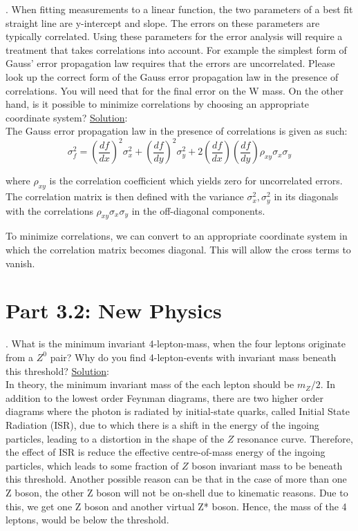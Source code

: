 \documentclass[a4paper]{report}
\numberwithin{equation}{section}
\begin{document}
.  When fitting measurements to a linear function, the two parameters of a best fit straight line are y-intercept and slope. The errors on these parameters are typically correlated. Using these parameters for the error analysis will require a treatment that takes correlations into account. For example the simplest form of Gauss’ error propagation law requires that the errors are uncorrelated. Please look up the correct form of the Gauss error propagation law in the presence of correlations. You will need that for the final error on the W mass. On the other hand, is it possible to minimize correlations by choosing an appropriate coordinate system?
\bigbreak
\noindent \underline{Solution}: \\
\noindent The Gauss error propagation law in the presence of correlations is given as such:
$$
	\sigma_f ^2 = \left( \frac{df}{dx} \right)^2 \sigma_x^2 + \left( \frac{df}{dy} \right)^2 \sigma_y^2 + 2 \left( \frac{df}{dx} \right) \left( \frac{df}{dy} \right) \rho_{xy} \sigma_{x} \sigma_y $$
	
\noindent where $\rho_{xy}$ is the correlation coefficient which yields zero for uncorrelated errors. The correlation matrix is then defined with the variance $\sigma_x^2, \sigma_y^2$ in its diagonals with the correlations $\rho_{xy} \sigma_x \sigma_y$ in the off-diagonal components.

\noindent To minimize correlations, we can convert to an appropriate coordinate system in which the correlation matrix becomes diagonal. This will allow the cross terms to vanish.

\section{Part 3.2: New Physics}

. What is the minimum invariant 4-lepton-mass, when the four leptons originate from a $Z^0$ pair? Why do you find 4-lepton-events with invariant mass beneath this threshold?
\bigbreak
\noindent \underline{Solution}: \\
\noindent In theory, the minimum invariant mass of the each lepton should be $m_Z / 2$. In addition to the lowest order Feynman diagrams, there are two higher order diagrams where the photon is radiated by initial-state quarks, called Initial State Radiation (ISR), due to which there is a shift in the energy of the ingoing particles, leading to a distortion in the shape of the $Z$ resonance curve. Therefore, the effect of ISR is reduce the effective centre-of-mass energy of the ingoing particles, which leads to some fraction of $Z$ boson invariant mass to be beneath this threshold. 
Another possible reason can be that in the case of more than one Z boson, the other Z boson will not be on-shell due to kinematic reasons. Due to this, we get one Z boson and another virtual Z* boson. Hence, the mass of the 4 leptons, would be below the threshold. 
\end{document}
